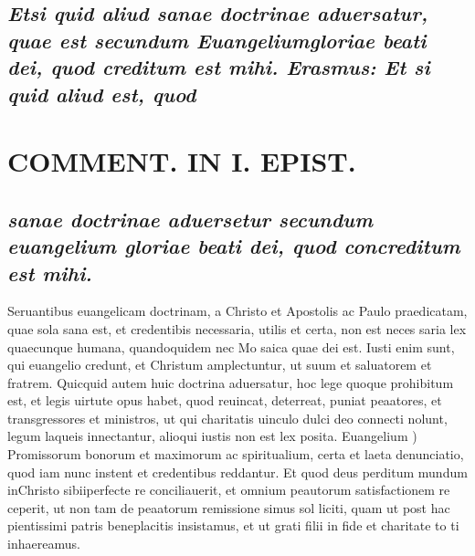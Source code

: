 \documentclass{article}
\begin{document}
\begin{pages}
\subsection*{\textit{Etsi quid aliud sanae doctrinae aduersatur, quae est secundum Euangeliumgloriae beati dei, quod creditum est mihi. Erasmus: Et si quid aliud est, quod }}
\section*{COMMENT. IN I. EPIST. }
\marginpar{[ p.22 ]}
{}
\subsection*{\textit{sanae doctrinae aduersetur secundum euangelium gloriae beati dei, quod concreditum est mihi. }}\pstart Seruantibus euangelicam doctrinam, a Christo et Apostolis ac Paulo praedicatam, quae sola sana est, et credentibis necessaria, utilis et certa, non est neces saria lex quaecunque humana, quandoquidem nec Mo saica quae dei est. Iusti enim sunt, qui euangelio credunt, et Christum amplectuntur, ut suum et saluatorem et fratrem. Quicquid autem huic doctrina aduersatur, hoc lege quoque prohibitum est, et legis uirtute opus habet, quod reuincat, deterreat, puniat peaatores, et transgressores et ministros, ut qui charitatis uinculo dulci deo connecti nolunt, legum laqueis innectantur, alioqui iustis non est lex posita.  \pend\pstart Euangelium ) Promissorum bonorum et maximorum ac spiritualium, certa et laeta denunciatio, quod iam nunc instent et credentibus reddantur. Et quod deus perditum mundum inChristo sibiiperfecte re conciliauerit, et omnium peautorum satisfactionem re ceperit, ut non tam de peaatorum remissione simus sol liciti, quam ut post hac pientissimi patris beneplacitis insistamus, et ut grati filii in fide et charitate to ti inhaereamus.  \pend

\end{pages}
\end{document}
